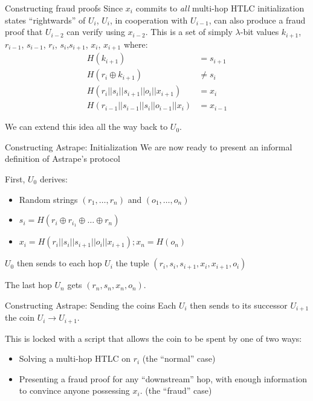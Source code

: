 \documentclass[aspectratio=169]{beamer}
\begin{document}
\begin{frame}{Constructing fraud proofs}
    Since $x_i$ commits to \emph{all} multi-hop HTLC initialization states ``rightwards'' of $U_i$, $U_i$, in cooperation with $U_{i-1}$, can also produce a fraud proof that $U_{i-2}$ can verify using $x_{i-2}$. This is a set of simply $\lambda$-bit values $k_{i+1}$, $r_{i-1}$, $s_{i-1}$, $r_i$, $s_i$,$s_{i+1}$, $x_i$, $x_{i+1}$ where:
    \begin{align*}
        H(k_{i+1})                               & = s_{i+1} \\
        H(r_i \oplus k_{i+1})                    & \neq s_i  \\
        H(r_i||s_i||s_{i+1}||o_i||x_{i+1})       & = x_i     \\
        H(r_{i-1}||s_{i-1}||s_{i}||o_{i-1}||x_i) & = x_{i-1}
    \end{align*}

    We can extend this idea all the way back to $U_0$.
\end{frame}

\begin{frame}{Constructing Astrape: Initialization}
    We are now ready to present an informal definition of Astrape's protocol

    First, $U_0$ derives:
    \begin{itemize}
        \item Random strings $(r_1,\dots,r_n)$ and $(o_1,\dots,o_n)$
        \item $s_i=H(r_i\oplus r_{i_1}\oplus\dots \oplus r_n)$
        \item $x_i=H(r_i||s_i||s_{i+1}||o_i||x_{i+1}); x_n=H(o_n)$
    \end{itemize}

    $U_0$ then sends to each hop $U_i$ the tuple $(r_i,s_i,s_{i+1},x_i,x_{i+1},o_i)$

    The last hop $U_n$ gets $(r_n,s_n,x_n,o_n)$.
\end{frame}

\begin{frame}{Constructing Astrape: Sending the coins}
    Each $U_i$ then sends to its successor $U_{i+1}$ the coin $U_i \rightarrow U_{i+1}$.

    This is locked with a script that allows the coin to be spent by one of two ways:
    \begin{itemize}
        \item Solving a multi-hop HTLC on $r_i$ (the ``normal'' case)
        \item Presenting a fraud proof for any ``downstream'' hop, with enough information to convince anyone possessing $x_i$. (the ``fraud'' case)
    \end{itemize}

\end{frame}
\end{document}
